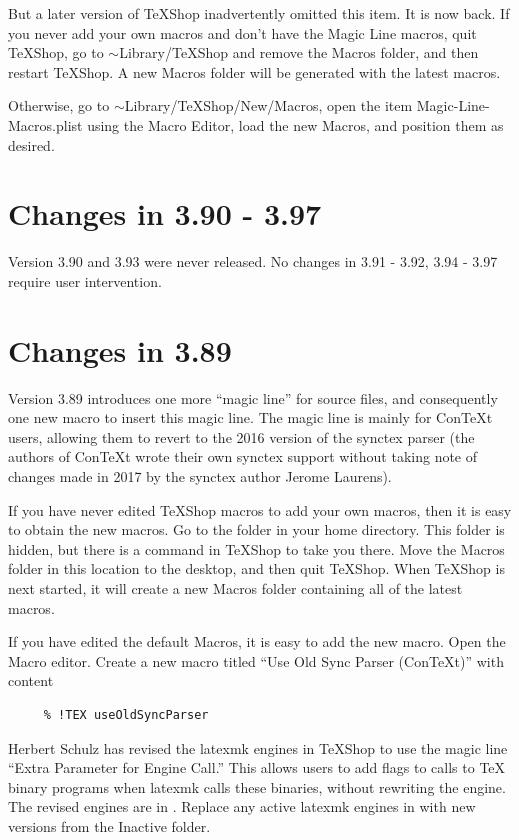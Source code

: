 \documentclass[11pt, oneside]{amsart}
\begin{document}
But a later version of TeXShop inadvertently omitted this item. It is now back. If you never add your own macros and don't have the Magic Line macros, quit TeXShop, go to $\sim$Library/TeXShop and remove the Macros folder, and then restart TeXShop. A new Macros folder will be generated with the latest macros.

Otherwise, go to $\sim$Library/TeXShop/New/Macros, open the item Magic-Line-Macros.plist using the Macro Editor, load the new Macros, and position them as desired.



\section{Changes in 3.90 - 3.97}

Version 3.90 and 3.93 were never released. No changes in 3.91 - 3.92, 3.94 - 3.97 require user intervention.


\section{Changes in 3.89}

Version 3.89 introduces one more ``magic line'' for source files, and consequently one new macro to insert this magic line. The magic line is mainly for ConTeXt users, allowing them to revert to the 2016 version of the synctex parser (the authors of ConTeXt wrote their own synctex support without taking note of changes made in 2017 by the synctex author Jerome Laurens). 

If you have never edited TeXShop macros to add your own macros, then it is easy to obtain the new macros.
Go to the  folder  in your home directory. This folder is hidden, but there is a command in TeXShop to take you there. Move the Macros folder in this location to the desktop,
and then quit TeXShop. When TeXShop is next started, it will create a new Macros folder containing all of the latest macros.

If you have edited the default Macros, it is easy to add the new macro. Open the Macro editor. Create a new macro titled ``Use Old Sync Parser (ConTeXt)'' with content
\begin{verbatim}
     % !TEX useOldSyncParser
\end{verbatim}

Herbert Schulz has revised the latexmk engines in TeXShop to use the magic line ``Extra Parameter for Engine Call.'' This allows users to add  flags to calls to TeX binary programs when latexmk calls these binaries, without rewriting the engine. The revised engines are in . Replace any active latexmk engines in
 with new versions from the Inactive folder.
\end{document}
